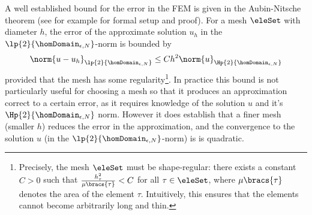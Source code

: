 A well established bound for the error in the FEM is given in the Aubin-Nitsche theorem (see for example \cite{johnson2012numerical} for formal setup and proof).
For a mesh $\eleSet$ with diameter $h$, the error of the approximate solution $u_{h}$ in the $\lp{2}{\homDomain_{\epsilon, N}}$-norm is bounded by
\begin{align*}
	\norm{u - u_{h}}_{\lp{2}{\homDomain_{\epsilon, N}}} \leq Ch^{2}\norm{u}_{\Hp{2}{\homDomain_{\epsilon, N}}}
\end{align*}
provided that the mesh has some regularity\footnote{Precisely, the mesh $\eleSet$ must be shape-regular: there exists a constant $C>0$ such that $\frac{h_{\tau}^{2}}{\mu\bracs{\tau}}<C$ for all $\tau\in\eleSet$, where $\mu\bracs{\tau}$ denotes the area of the element $\tau$. Intuitively, this ensures that the elements cannot become arbitrarily long and thin.}.
In practice this bound is not particularly useful for choosing a mesh so that it produces an approximation correct to a certain error, as it requires knowledge of the solution $u$ and it's $\Hp{2}{\homDomain_{\epsilon, N}}$ norm.
However it does establish that a finer mesh (smaller $h$) reduces the error in the approximation, and the convergence to the solution $u$ (in the $\lp{2}{\homDomain_{\epsilon, N}}$-norm) is is quadratic. \newline

